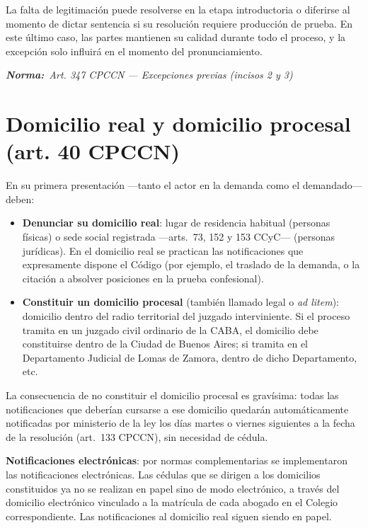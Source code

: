 \documentclass[12pt,oneside]{book}
\newcommand{\normaref}[1]{%
    \par\noindent\textbf{\textit{Norma:}}~\textit{#1}\par\vspace{0.2em}
}
\begin{document}
La falta de legitimación puede resolverse en la etapa introductoria o diferirse al momento de dictar sentencia si su resolución requiere producción de prueba. En este último caso, las partes mantienen su calidad durante todo el proceso, y la excepción solo influirá en el momento del pronunciamiento.

\normaref{Art. 347 CPCCN --- Excepciones previas (incisos 2 y 3)}

\section{Domicilio real y domicilio procesal (art. 40 CPCCN)}

En su primera presentación —tanto el actor en la demanda como el demandado— deben:

\begin{itemize}
    \item \textbf{Denunciar su domicilio real}: lugar de residencia habitual (personas físicas) o sede social registrada —arts.\ 73, 152 y 153 CCyC— (personas jurídicas). En el domicilio real se practican las notificaciones que expresamente dispone el Código (por ejemplo, el traslado de la demanda, o la citación a absolver posiciones en la prueba confesional).
    \item \textbf{Constituir un domicilio procesal} (también llamado legal o \textit{ad litem}): domicilio dentro del radio territorial del juzgado interviniente. Si el proceso tramita en un juzgado civil ordinario de la CABA, el domicilio debe constituirse dentro de la Ciudad de Buenos Aires; si tramita en el Departamento Judicial de Lomas de Zamora, dentro de dicho Departamento, etc.
\end{itemize}

\begin{important}
La consecuencia de no constituir el domicilio procesal es gravísima: todas las notificaciones que deberían cursarse a ese domicilio quedarán automáticamente notificadas por ministerio de la ley los días martes o viernes siguientes a la fecha de la resolución (art.\ 133 CPCCN), sin necesidad de cédula.
\end{important}

\textbf{Notificaciones electrónicas}: por normas complementarias se implementaron las notificaciones electrónicas. Las cédulas que se dirigen a los domicilios constituidos ya no se realizan en papel sino de modo electrónico, a través del domicilio electrónico vinculado a la matrícula de cada abogado en el Colegio correspondiente. Las notificaciones al domicilio real siguen siendo en papel.
\end{document}
